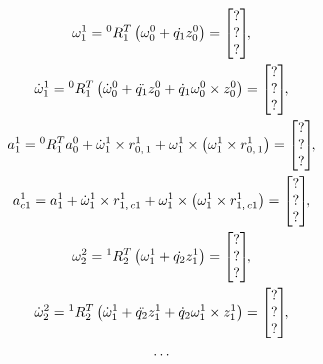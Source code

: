\begin{gather}
    \omega^1_1 = {}^{0}R_1^T\left(\omega^{0}_{0} + \dot{q_1}z^{0}_{0}\right) =
    \begin{bmatrix}
        ? \\ ? \\ ?
    \end{bmatrix}\!\!,
    \\
    \dot{\omega}^1_1 = {}^{0}R_1^T\left(\dot{\omega}^0_0 + \ddot{q_1}z^0_0 + \dot{q}_1\omega^0_0 \times z^0_0 \right) =
    \begin{bmatrix}
        ? \\ ? \\ ?
    \end{bmatrix}\!\!,
    \\
    a^1_1 = {}^{0}R_1^Ta^0_0 + \dot{\omega}^1_1 \times r^1_{0,\,1} + \omega^1_1 \times \left(\omega^1_1 \times r^1_{0,\,1}\right) =
    \begin{bmatrix}
        ? \\ ? \\ ?
    \end{bmatrix}\!\!,
    \\
    a^1_{c1} = a^1_1 + \dot{\omega}^1_1 \times r^1_{1,\,c1} + \omega^1_1 \times \left(\omega^1_1 \times r^1_{1,\,c1}\right) =
    \begin{bmatrix}
        ? \\ ? \\ ?
    \end{bmatrix}\!\!,
    \\
    \omega^2_2 = {}^{1}R_2^T\left(\omega^{1}_{1} + \dot{q_2}z^{1}_{1}\right) =
    \begin{bmatrix}
        ? \\ ? \\ ?
    \end{bmatrix}\!\!,
    \\
    \dot{\omega}^2_2 = {}^{1}R_2^T\left(\dot{\omega}^1_1 + \ddot{q_2}z^1_1 + \dot{q}_2\omega^1_1 \times z^1_1 \right) =
    \begin{bmatrix}
        ? \\ ? \\ ?
    \end{bmatrix}\!\!,
    \\
    \ldots\notag
\end{gather}


